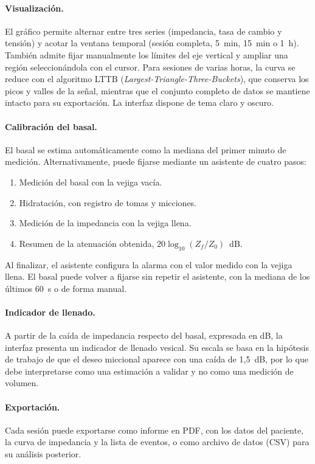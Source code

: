 \documentclass[12pt,a4paper]{article}
\begin{document}
\paragraph{Visualización.} El gráfico permite alternar entre tres series (impedancia, tasa de cambio y tensión) y acotar la ventana temporal (sesión completa, 5~min, 15~min o 1~h). También admite fijar manualmente los límites del eje vertical y ampliar una región seleccionándola con el cursor. Para sesiones de varias horas, la curva se reduce con el algoritmo LTTB (\textit{Largest-Triangle-Three-Buckets}), que conserva los picos y valles de la señal, mientras que el conjunto completo de datos se mantiene intacto para su exportación. La interfaz dispone de tema claro y oscuro.

\paragraph{Calibración del basal.} El basal se estima automáticamente como la mediana del primer minuto de medición. Alternativamente, puede fijarse mediante un asistente de cuatro pasos:
\begin{enumerate}
    \item Medición del basal con la vejiga vacía.
    \item Hidratación, con registro de tomas y micciones.
    \item Medición de la impedancia con la vejiga llena.
    \item Resumen de la atenuación obtenida, $20\log_{10}(Z_f/Z_0)$~dB.
\end{enumerate}
Al finalizar, el asistente configura la alarma con el valor medido con la vejiga llena. El basal puede volver a fijarse sin repetir el asistente, con la mediana de los últimos 60~s o de forma manual.

\paragraph{Indicador de llenado.} A partir de la caída de impedancia respecto del basal, expresada en dB, la interfaz presenta un indicador de llenado vesical. Su escala se basa en la hipótesis de trabajo de que el deseo miccional aparece con una caída de 1,5~dB, por lo que debe interpretarse como una estimación a validar y no como una medición de volumen.

\paragraph{Exportación.} Cada sesión puede exportarse como informe en PDF, con los datos del paciente, la curva de impedancia y la lista de eventos, o como archivo de datos (CSV) para su análisis posterior.
\end{document}

